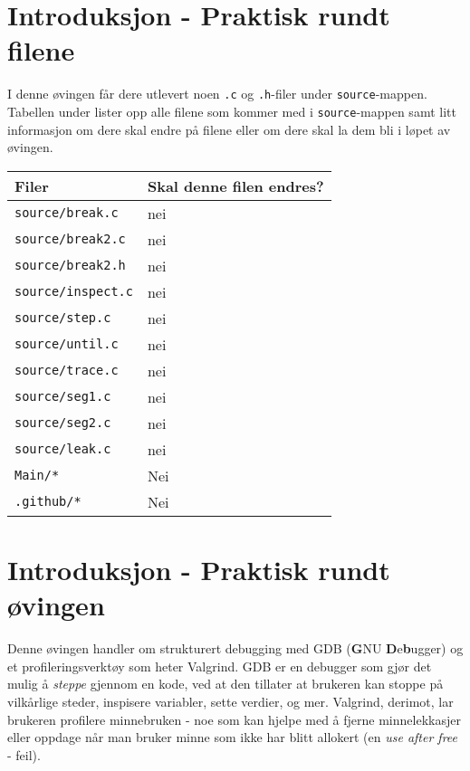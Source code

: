 

\begin{alphasection}

\section{Introduksjon - Praktisk rundt filene}

I denne øvingen får dere utlevert noen \verb|.c| og \verb|.h|-filer under \verb|source|-mappen. Tabellen under lister opp alle filene som kommer med i \verb|source|-mappen samt litt informasjon om dere skal endre på filene eller om dere skal la dem bli i løpet av øvingen.

\begin{center}
 \begin{tabular}{|p{8.5cm} p{5.5cm}|} 
 \hline
 \textbf{Filer} & \textbf{Skal denne filen endres?}  \\ [0.5ex] 
 \hline\hline
  \verb|source/break.c| & nei  \\ 
 \hline
 \verb|source/break2.c| & nei  \\ 
 \hline
 \verb|source/break2.h| & nei  \\ 
 \hline
 \verb|source/inspect.c| & nei  \\ 
 \hline
 \verb|source/step.c| & nei  \\ 
 \hline
  \verb|source/until.c| & nei  \\ 
 \hline
  \verb|source/trace.c| & nei  \\ 
 \hline
  \verb|source/seg1.c| & nei  \\ 
 \hline
  \verb|source/seg2.c| & nei  \\ 
 \hline
  \verb|source/leak.c| & nei  \\ 
 \hline
  \verb|Main/*| & Nei  \\ 
 \hline
  \verb|.github/*| & Nei \\
 \hline 
\end{tabular}
\end{center}

\section{Introduksjon - Praktisk rundt øvingen}\label{sec:2-innføring}

Denne øvingen handler om strukturert debugging med GDB (\textbf{G}NU \textbf{D}e\textbf{b}ugger) og et profileringsverktøy som heter Valgrind. GDB er en debugger som gjør det mulig å \textit{steppe} gjennom en kode, ved at den tillater at brukeren kan stoppe på vilkårlige steder, inspisere variabler, sette verdier, og mer. Valgrind, derimot, lar brukeren profilere minnebruken - noe som kan hjelpe med å fjerne minnelekkasjer eller oppdage når man bruker minne som ikke har blitt allokert (en \textit{use after free} - feil).



\end{alphasection}
